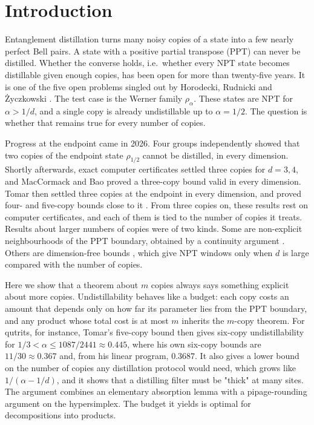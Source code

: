 \documentclass[11pt]{article}
\theoremstyle{remark}
\begin{document}
\section{Introduction}
Entanglement distillation turns many noisy copies of a state into a few nearly perfect Bell pairs. A state with a
positive partial transpose (PPT) can never be distilled. Whether the converse holds, i.e.\ whether every NPT state
becomes distillable given enough copies, has been open for more than twenty-five years. It is one of the five open
problems singled out by Horodecki, Rudnicki and \.Zyczkowski \cite{HRZ}. The test case is the Werner family $\rho_\alpha$. These
states are NPT for $\alpha>1/d$, and a single copy is already undistillable up to $\alpha=1/2$. The question is
whether that remains true for every number of copies.

Progress at the endpoint came in 2026. Four groups independently showed that two copies of the endpoint state
$\rho_{1/2}$ cannot be distilled, in every dimension. Shortly afterwards, exact computer certificates settled three
copies for $d=3,4$, and MacCormack and Bao proved a three-copy bound valid in every dimension. Tomar then settled
three copies at the endpoint in every dimension, and proved four- and five-copy bounds close to it \cite{Tomar}. From three copies on, these results rest on computer
certificates, and each of them is tied to the number of copies it treats. Results about larger numbers of
copies were of two kinds. Some are non-explicit neighbourhoods of the PPT boundary, obtained by a continuity argument
\cite{DSSTT}. Others are dimension-free bounds \cite{QGWG,BGH,Tomar}, which give NPT windows only when $d$ is large
compared with the number of copies.

Here we show that a theorem about $m$ copies always says something explicit about more copies. Undistillability
behaves like a budget: each copy costs an amount that depends only on how far its parameter lies from the PPT
boundary, and any product whose total cost is at most $m$ inherits the $m$-copy theorem. For qutrits, for instance,
Tomar's five-copy bound then gives six-copy undistillability for $1/3<\alpha\le1087/2441\approx0.445$, where his own
six-copy bounds are $11/30\approx0.367$ and, from his linear program, $0.3687$. It also gives a lower bound on the number of copies any
distillation protocol would need, which grows like $1/(\alpha-1/d)$, and it shows that a distilling filter must be
"thick" at many sites. The argument combines an elementary absorption lemma with a pipage-rounding argument on the
hypersimplex. The budget it yields is optimal for decompositions into products.
\end{document}
